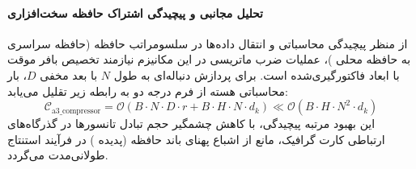 \paragraph{تحلیل مجانبی و پیچیدگی اشتراک حافظه سخت‌افزاری}
از منظر پیچیدگی محاسباتی و انتقال داده‌ها در سلسومراتب حافظه (حافظه سراسری  به حافظه محلی )، عملیات ضرب ماتریسی در این مکانیزم نیازمند تخصیص بافر موقت با ابعاد فاکتورگیری‌شده است. برای پردازش دنباله‌ای به طول $N$ با بعد مخفی $D$، بار محاسباتی هسته از فرم درجه دو به رابطه زیر تقلیل می‌یابد:
\begin{equation}
\label{eq:complexity_a3_compressor}
\mathcal{C}_{\text{a3\_compressor}} = \mathcal{O}\left( B \cdot N \cdot D \cdot r + B \cdot H \cdot N \cdot d_k \right) \ll \mathcal{O}\left( B \cdot H \cdot N^2 \cdot d_k \right)
\end{equation}
این بهبود مرتبه پیچیدگی، با کاهش چشمگیر حجم تبادل تانسورها در گذرگاه‌های ارتباطی کارت گرافیک، مانع از اشباع پهنای باند حافظه (پدیده ) در فرآیند استنتاج طولانی‌مدت می‌گردد.
